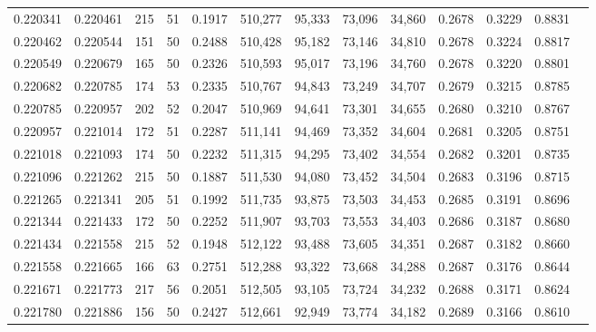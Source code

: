 \begin{tabular}{rrrrrrrrrrrrr}
0.220341 & 0.220461 &   215 &  51 &                                     0.1917 & 510,277 &  95,333 &  73,096 &  34,860 & 0.2678 & 0.3229 & 0.8831 \\
0.220462 & 0.220544 &   151 &  50 &                                     0.2488 & 510,428 &  95,182 &  73,146 &  34,810 & 0.2678 & 0.3224 & 0.8817 \\
0.220549 & 0.220679 &   165 &  50 &                                     0.2326 & 510,593 &  95,017 &  73,196 &  34,760 & 0.2678 & 0.3220 & 0.8801 \\
0.220682 & 0.220785 &   174 &  53 &                                     0.2335 & 510,767 &  94,843 &  73,249 &  34,707 & 0.2679 & 0.3215 & 0.8785 \\
0.220785 & 0.220957 &   202 &  52 &                                     0.2047 & 510,969 &  94,641 &  73,301 &  34,655 & 0.2680 & 0.3210 & 0.8767 \\
0.220957 & 0.221014 &   172 &  51 &                                     0.2287 & 511,141 &  94,469 &  73,352 &  34,604 & 0.2681 & 0.3205 & 0.8751 \\
0.221018 & 0.221093 &   174 &  50 &                                     0.2232 & 511,315 &  94,295 &  73,402 &  34,554 & 0.2682 & 0.3201 & 0.8735 \\
0.221096 & 0.221262 &   215 &  50 &                                     0.1887 & 511,530 &  94,080 &  73,452 &  34,504 & 0.2683 & 0.3196 & 0.8715 \\
0.221265 & 0.221341 &   205 &  51 &                                     0.1992 & 511,735 &  93,875 &  73,503 &  34,453 & 0.2685 & 0.3191 & 0.8696 \\
0.221344 & 0.221433 &   172 &  50 &                                     0.2252 & 511,907 &  93,703 &  73,553 &  34,403 & 0.2686 & 0.3187 & 0.8680 \\
0.221434 & 0.221558 &   215 &  52 &                                     0.1948 & 512,122 &  93,488 &  73,605 &  34,351 & 0.2687 & 0.3182 & 0.8660 \\
0.221558 & 0.221665 &   166 &  63 &                                     0.2751 & 512,288 &  93,322 &  73,668 &  34,288 & 0.2687 & 0.3176 & 0.8644 \\
0.221671 & 0.221773 &   217 &  56 &                                     0.2051 & 512,505 &  93,105 &  73,724 &  34,232 & 0.2688 & 0.3171 & 0.8624 \\
0.221780 & 0.221886 &   156 &  50 &                                     0.2427 & 512,661 &  92,949 &  73,774 &  34,182 & 0.2689 & 0.3166 & 0.8610 \\

\end{tabular}
